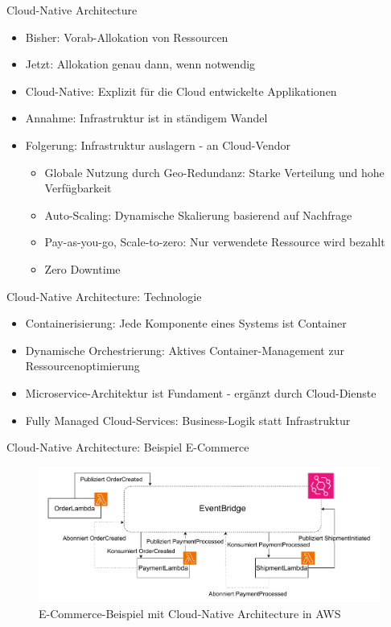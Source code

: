 
\begin{frame}{Cloud-Native Architecture}
    \begin{itemize}
        \item Bisher: Vorab-Allokation von Ressourcen
        \item Jetzt: Allokation genau dann, wenn notwendig
        \item Cloud-Native: Explizit für die Cloud entwickelte Applikationen \cite{cloudNative}
        \item Annahme: Infrastruktur ist in ständigem Wandel
        \item Folgerung: Infrastruktur auslagern - an Cloud-Vendor
        \begin{itemize}
            \item Globale Nutzung durch Geo-Redundanz: Starke Verteilung und hohe Verfügbarkeit
            \item Auto-Scaling: Dynamische Skalierung basierend auf Nachfrage
            \item Pay-as-you-go, Scale-to-zero: Nur verwendete Ressource wird bezahlt
            \item Zero Downtime
        \end{itemize}
    \end{itemize}
\end{frame}

\begin{frame}{Cloud-Native Architecture: Technologie}
    \begin{itemize}
        \item Containerisierung: Jede Komponente eines Systems ist Container
        \item Dynamische Orchestrierung: Aktives Container-Management zur Ressourcenoptimierung
        \item Microservice-Architektur ist Fundament - ergänzt durch Cloud-Dienste
        \item Fully Managed Cloud-Services: Business-Logik statt Infrastruktur
    \end{itemize}
\end{frame}

\begin{frame}{Cloud-Native Architecture: Beispiel E-Commerce}
    \begin{figure}[!h]
        \centering
        \includegraphics[scale=0.5]{imglib/cloud-native/cloud-native-ecommerce.drawio}
        \caption{E-Commerce-Beispiel mit Cloud-Native Architecture in AWS}
        \label{fig:cloudnativeecommerce}
    \end{figure}
\end{frame}

